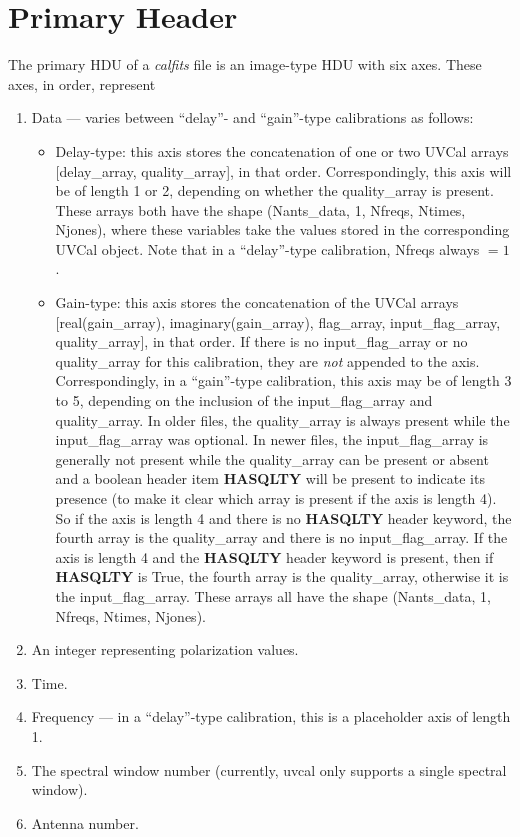 \documentclass[11pt, oneside, english]{article}   	%
\begin{document}
\section{Primary Header}\label{primary}
The primary HDU of a \emph{calfits} file is an image-type HDU with six axes.
These axes, in order, represent 
\begin{enumerate}
	\item{Data --- varies between ``delay''- and ``gain''-type calibrations as follows:}
	\begin{itemize}
	\item Delay-type: this axis stores the concatenation of one or two UVCal arrays [delay\_array, quality\_array], in that order.
	Correspondingly, this axis will be of length 1 or 2, depending on whether the quality\_array is present.
	These arrays both have the shape (Nants\_data, 1, Nfreqs, Ntimes, Njones), where these variables take the values stored in the corresponding UVCal object. 
	Note that in a ``delay''-type calibration, Nfreqs always $=1$.
	\item Gain-type: this axis stores the concatenation of the UVCal arrays [real(gain\_array), imaginary(gain\_array), flag\_array, input\_flag\_array, quality\_array], in that order.
	If there is no input\_flag\_array or no quality\_array for this calibration, they are \emph{not} appended to the axis.
	Correspondingly, in a ``gain''-type calibration, this axis may be of length 3 to 5, depending on the inclusion of the input\_flag\_array and quality\_array.
	In older files, the quality\_array is always present while the input\_flag\_array was optional. In newer files, the input\_flag\_array is generally
	not present while the quality\_array can be present or absent and a boolean header item \textbf{HASQLTY} will be present to indicate its presence
	(to make it clear which array is present if the axis is length 4). So if the axis is length 4 and there is no \textbf{HASQLTY} header keyword,
	the fourth array is the quality\_array and there is no input\_flag\_array. If the axis is length 4 and the \textbf{HASQLTY} header keyword is present, then
	if \textbf{HASQLTY} is True, the fourth array is the quality\_array, otherwise it is the input\_flag\_array.
	These arrays all have the shape (Nants\_data, 1, Nfreqs, Ntimes, Njones).
	\end{itemize}
	\item{An integer representing polarization values.}
	\item{Time.}
	\item{Frequency --- in a ``delay''-type calibration, this is a placeholder axis of length 1.}
	\item{The spectral window number (currently, uvcal only supports a single spectral window).}
	\item{Antenna number.}
\end{enumerate}
\end{document}
